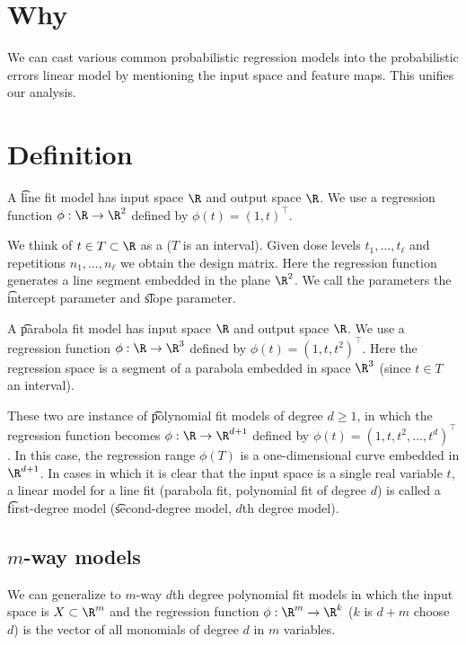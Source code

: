 

\section*{Why}

We can cast various common probabilistic regression models into the probabilistic errors linear model by mentioning the input space and feature maps.
This unifies our analysis.

\section*{Definition}


A \t{line fit model} has input space $\R $ and output space $\R $.
We use a regression function $\phi : \R  \to \R ^2$ defined by $\phi (t) = (1, t)^\top $.

We think of $t \in T \subset \R $ as a  ($T$ is an interval).
Given dose levels $t_1, \dots , t_\ell $ and repetitions $n_1, \dots , n_\ell $ we obtain the design matrix.
Here the regression function generates a line segment embedded in the plane $\R ^2$.
We call the parameters the \t{intercept parameter} and \t{slope parameter}.

A \t{parabola fit model} has input space $\R $ and output space $\R $.
We use a regression function $\phi : \R  \to \R ^3$ defined by $\phi (t) = (1, t, t^2)^\top $.
Here the regression space is a segment of a parabola embedded in space $\R ^3$ (since $t \in T$ an interval).

These two are instance of \t{polynomial fit models} of degree $d \geq 1$, in which the regression function becomes $\phi : \R \to \R ^{d + 1}$ defined by $\phi (t) = (1, t, t^2, \dots , t^d)^\top $.
In this case, the regression range $\phi (T)$ is a one-dimensional curve embedded in $\R ^{d+1}$.
In cases in which it is clear that the input space is a single real variable $t$, a linear model for a line fit (parabola fit, polynomial fit of degree $d$) is called a \t{first-degree model} (\t{second-degree model}, \t{$d$th degree model}).

\subsection*{$m$-way models}

We can generalize to \t{$m$-way $d$th degree polynomial fit models} in which the input space is $X \subset \R ^m$ and the regression function $\phi : \R ^m \to \R ^k$ ($k$ is $d+m$ choose $d$) is the vector of all monomials of degree $d$ in $m$ variables.

